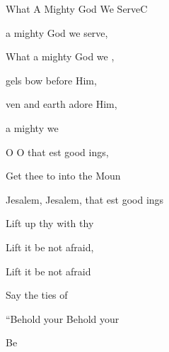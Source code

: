 \documentclass[12pt]{book}
\begin{document}
\begin{song}{What A Mighty God We Serve}{C}
\begin{SBExtraKeys}
{    \begin{SBOpGroup}
       a mighty God we serve,
        
      What a mighty God we ,
      
      gels bow before Him,
      
      ven and earth adore Him,
      
       a mighty  we \Ch{[}{} \Ch{]}{}
    \end{SBOpGroup}

    \begin{SBVerse}
      O  O  that est good ings,
                
      Get thee  to into the  Moun

      Jesalem, Jesalem, that est good ings

      Lift up thy  with  thy 

      Lift it  be not afraid,

      Lift it  be not afraid

      Say  the ties of 

      ``Behold your  Behold your 

      Be  
    \end{SBVerse}
  }\end{SBExtraKeys}
\end{song}
\end{document}
